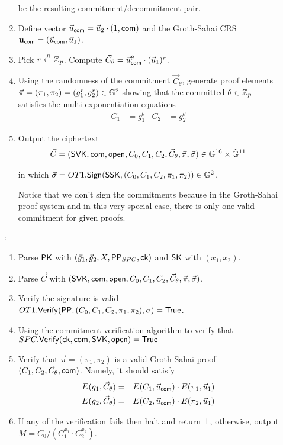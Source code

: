 \begin{description}
\begin{enumerate}
    be the resulting commitment/decommitment pair.
  \item Define vector $\vec{u}_{\mathsf{com}} = \vec{u}_2\cdot (1, \mathsf{com})$ and the Groth-Sahai CRS $\mathbf{u}_{\mathsf{com}}=(\vec{u}_{\mathsf{com}},\vec{u}_1)$. 
  \item Pick $r \stackrel{{\scriptscriptstyle \mkern4mu R}}{\gets} \mathbb{Z}_p$. Compute $\vec{C}_{\theta} = \vec{u}_{\mathsf{com}}^{\theta} \cdot (\vec{u}_1)^r$.
  \item Using the randomness of the commitment $\vec{C}_{\theta}$, generate  proof elements $\vec{\pi}=(\pi_1,\pi_2)=(g_1^r,g_2^r) \in \mathbb{G}^2$ showing that the committed $\theta \in \mathbb{Z}_p$ satisfies the multi-exponentiation equations
    \begin{align*}
      C_1 &= g_1^{\theta} & C_2 &= g_2^{\theta}
    \end{align*}
  \item Output the ciphertext
    \begin{align*}
      \vec{C} = (\mathsf{SVK}, \mathsf{com}, \mathsf{open}, C_0, C_1, C_2, \vec{C}_{\theta}, \vec{\pi}, \vec{\sigma}) \in \mathbb{G}^{16} \times \hat{\mathbb{G}}^{11}
    \end{align*}
    
    
    in which $\vec{\sigma} = OT1.{\mathsf{Sign}}(\mathsf{SSK}, (C_0, C_1, C_2, {\pi}_1,\pi_2)) \in \mathbb{G}^2$.

    Notice that we don't sign the commitments because in the Groth-Sahai proof system and in this very special case, there is only one valid commitment for given proofs.
    
  \end{enumerate}
  
\item[\boldmath{$SPCCA.\Dec(\PK, \vec{C}, \SK)$}]:
  \begin{enumerate}
  \item Parse $\mathsf{PK}$ with $(\vec{g}_1, \vec{g}_2, X, \mathsf{PP}_{SPC}, \mathsf{ck})$ and $\mathsf{SK}$ with $(x_1, x_2)$.
  \item Parse $\vec{C}$ with $ (\mathsf{SVK}, \mathsf{com}, \mathsf{open}, C_0, C_1, C_2, \vec{C}_{\theta}, \vec{\pi}, \vec{\sigma})$.
  \item Verify the signature is valid $OT1.{\mathsf{Verify}}(\mathsf{PP},  (C_0, C_1, C_2, \pi_1,\pi_2), \sigma) = \mathsf{True}$.
  \item Using the commitment verification algorithm to verify that $SPC.{\mathsf{Verify}}(\mathsf{ck}, \mathsf{com}, \mathsf{SVK}, \mathsf{open}) = \mathsf{True}$
  \item Verify that $\vec{\pi}=(\pi_1,\pi_2)$ is a valid Groth-Sahai proof \wrt  $(C_1, C_2, \vec{C}_{\theta}, \mathsf{com})$. Namely, 
    it should satisfy 
    \begin{eqnarray} \label{ver-eq} 
      E(g_1,\vec{C}_{\theta}) &=& E(C_1 , \vec{u}_{\mathsf{com}}) \cdot E(\pi_1,\vec{u}_1) \\ \nonumber
      E(g_2,\vec{C}_{\theta}) &=& E(C_2 , \vec{u}_{\mathsf{com}}) \cdot E(\pi_2,\vec{u}_1)
    \end{eqnarray}
  \item If any of the verification fails then halt and return $\bot$, otherwise, output $M=C_0/(C_1^{x_1}\cdot C_2^{x_2})$.
  \end{enumerate}
  
\end{description}


